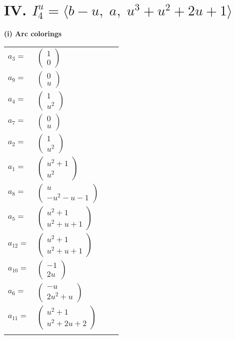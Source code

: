 \documentclass[1p]{elsarticle_modified}
\theoremstyle{definition}
\begin{document}
\centering \section*{IV. $I^u_{4}= \langle b- u,\;a,\;u^3+u^2+2 u+1 \rangle$}
\flushleft \textbf{(i) Arc colorings}\\
\begin{tabular}{m{7pt} m{180pt} m{7pt} m{180pt} }
\flushright $a_{3}=$&$\begin{pmatrix}1\\0\end{pmatrix}$ \\
\flushright $a_{9}=$&$\begin{pmatrix}0\\u\end{pmatrix}$ \\
\flushright $a_{4}=$&$\begin{pmatrix}1\\u^2\end{pmatrix}$ \\
\flushright $a_{7}=$&$\begin{pmatrix}0\\u\end{pmatrix}$ \\
\flushright $a_{2}=$&$\begin{pmatrix}1\\u^2\end{pmatrix}$ \\
\flushright $a_{1}=$&$\begin{pmatrix}u^2+1\\u^2\end{pmatrix}$ \\
\flushright $a_{8}=$&$\begin{pmatrix}u\\- u^2- u-1\end{pmatrix}$ \\
\flushright $a_{5}=$&$\begin{pmatrix}u^2+1\\u^2+u+1\end{pmatrix}$ \\
\flushright $a_{12}=$&$\begin{pmatrix}u^2+1\\u^2+u+1\end{pmatrix}$ \\
\flushright $a_{10}=$&$\begin{pmatrix}-1\\2 u\end{pmatrix}$ \\
\flushright $a_{6}=$&$\begin{pmatrix}- u\\2 u^2+u\end{pmatrix}$ \\
\flushright $a_{11}=$&$\begin{pmatrix}u^2+1\\u^2+2 u+2\end{pmatrix}$\\&\end{tabular}
\end{document}

